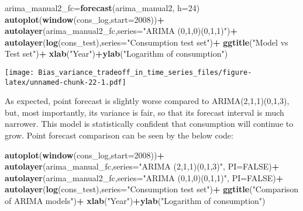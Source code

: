 \documentclass[
]{article}
\newenvironment{Shaded}{\begin{snugshade}}{\end{snugshade}}
\newcommand{\DataTypeTok}[1]{\textcolor[rgb]{0.13,0.29,0.53}{#1}}
\newcommand{\DecValTok}[1]{\textcolor[rgb]{0.00,0.00,0.81}{#1}}
\newcommand{\KeywordTok}[1]{\textcolor[rgb]{0.13,0.29,0.53}{\textbf{#1}}}
\newcommand{\NormalTok}[1]{#1}
\newcommand{\OperatorTok}[1]{\textcolor[rgb]{0.81,0.36,0.00}{\textbf{#1}}}
\newcommand{\OtherTok}[1]{\textcolor[rgb]{0.56,0.35,0.01}{#1}}
\newcommand{\StringTok}[1]{\textcolor[rgb]{0.31,0.60,0.02}{#1}}
\begin{document}
\begin{Shaded}
\begin{Highlighting}[]
\NormalTok{arima_manual2_fc=}\KeywordTok{forecast}\NormalTok{(arima_manual2, }\DataTypeTok{h=}\DecValTok{24}\NormalTok{)}
\KeywordTok{autoplot}\NormalTok{(}\KeywordTok{window}\NormalTok{(cons_log,}\DataTypeTok{start=}\DecValTok{2008}\NormalTok{))}\OperatorTok{+}
\StringTok{  }\KeywordTok{autolayer}\NormalTok{(arima_manual2_fc,}\DataTypeTok{series=}\StringTok{"ARIMA (0,1,0)(0,1,1)"}\NormalTok{)}\OperatorTok{+}
\StringTok{  }\KeywordTok{autolayer}\NormalTok{(}\KeywordTok{log}\NormalTok{(cons_test),}\DataTypeTok{series=}\StringTok{"Consumption test set"}\NormalTok{)}\OperatorTok{+}
\StringTok{  }\KeywordTok{ggtitle}\NormalTok{(}\StringTok{"Model vs Test set"}\NormalTok{)}\OperatorTok{+}
\StringTok{  }\KeywordTok{xlab}\NormalTok{(}\StringTok{"Year"}\NormalTok{)}\OperatorTok{+}\KeywordTok{ylab}\NormalTok{(}\StringTok{"Logarithm of consumption"}\NormalTok{)}
\end{Highlighting}
\end{Shaded}

\texttt{[image: Bias\_variance\_tradeoff\_in\_time\_series\_files/figure-latex/unnamed-chunk-22-1.pdf]}

As expected, point forecast is slightly worse compared to
ARIMA(2,1,1)(0,1,3), but, most importantly, its variance is fair, so
that its forecast interval is much narrower. This model is statistically
confident that consumption will continue to grow. Point forecast
comparison can be seen by the below code:

\begin{Shaded}
\begin{Highlighting}[]
\KeywordTok{autoplot}\NormalTok{(}\KeywordTok{window}\NormalTok{(cons_log,}\DataTypeTok{start=}\DecValTok{2008}\NormalTok{))}\OperatorTok{+}
\StringTok{  }\KeywordTok{autolayer}\NormalTok{(arima_manual_fc,}\DataTypeTok{series=}\StringTok{"ARIMA (2,1,1)(0,1,3)"}\NormalTok{, }\DataTypeTok{PI=}\OtherTok{FALSE}\NormalTok{)}\OperatorTok{+}
\StringTok{  }\KeywordTok{autolayer}\NormalTok{(arima_manual2_fc,}\DataTypeTok{series=}\StringTok{"ARIMA (0,1,0)(0,1,1)"}\NormalTok{, }\DataTypeTok{PI=}\OtherTok{FALSE}\NormalTok{)}\OperatorTok{+}
\StringTok{  }\KeywordTok{autolayer}\NormalTok{(}\KeywordTok{log}\NormalTok{(cons_test),}\DataTypeTok{series=}\StringTok{"Consumption test set"}\NormalTok{)}\OperatorTok{+}
\StringTok{  }\KeywordTok{ggtitle}\NormalTok{(}\StringTok{"Comparison of ARIMA models"}\NormalTok{)}\OperatorTok{+}
\StringTok{  }\KeywordTok{xlab}\NormalTok{(}\StringTok{"Year"}\NormalTok{)}\OperatorTok{+}\KeywordTok{ylab}\NormalTok{(}\StringTok{"Logarithm of consumption"}\NormalTok{)}
\end{Highlighting}
\end{Shaded}
\end{document}
